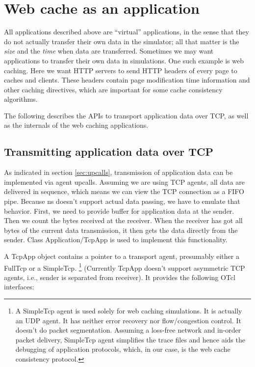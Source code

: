 \chapter{Web cache as an application}
\label{chap:webcache}

All applications described above are ``virtual'' applications, in the sense
that they do not actually transfer their own data in the simulator; all 
that matter is the \emph{size} and the \emph{time} when data are transferred.
Sometimes we may want applications to transfer their own data in simulations.
One such example is web caching. Here we want HTTP servers to send HTTP 
headers of every page to caches and clients. These headers contain 
page modification time information and other caching directives, which are 
important for some cache consistency algorithms.

The following describes the APIs to transport application data over TCP, 
as well as the internals of the web caching applications.

\section{Transmitting application data over TCP}
\label{sec:webcache-tcpapp}

As indicated in section \ref{sec:upcalls}, transmission of application data
can be implemented via agent upcalls. Assuming we are using TCP agents, 
all data are delivered in sequence, which means we can view the TCP 
connection as a FIFO pipe. Because ns doesn't support actual data passing, 
we have to emulate that behavior. First, we need to provide buffer 
for application data at the sender. Then we count the bytes received at the 
receiver. When the receiver has got all bytes of the current data transmission,
it then gets the data directly from the sender. Class Application/TcpApp is 
used to implement this functionality.

A TcpApp object contains a pointer to a transport agent, presumably either
a FullTcp or a SimpleTcp.
\footnote{A SimpleTcp agent is used solely for web caching simulations. It 
is actually an UDP agent. It has neither error recovery nor flow/congestion
control. It doesn't do packet segmentation. Assuming a loss-free network 
and in-order packet delivery,
SimpleTcp agent simplifies the trace files 
and hence aids the debugging of application protocols, which, in our case, 
is the web cache consistency protocol.}
(Currently TcpApp doesn't support asymmetric TCP agents, i.e., sender is
separated from receiver). It provides the following OTcl interfaces:

